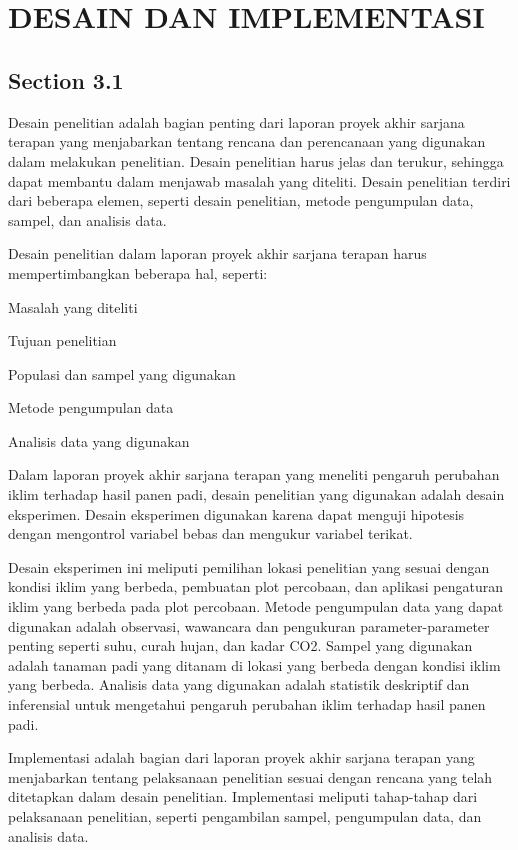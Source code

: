 \chapter[DESAIN DAN IMPLEMENTASI]{\\ DESAIN DAN IMPLEMENTASI}

\section{Section 3.1}
Desain penelitian adalah bagian penting dari laporan proyek akhir sarjana terapan yang menjabarkan tentang rencana dan perencanaan yang digunakan dalam melakukan penelitian. Desain penelitian harus jelas dan terukur, sehingga dapat membantu dalam menjawab masalah yang diteliti. Desain penelitian terdiri dari beberapa elemen, seperti desain penelitian, metode pengumpulan data, sampel, dan analisis data.

Desain penelitian dalam laporan proyek akhir sarjana terapan harus mempertimbangkan beberapa hal, seperti:
\begin{packed_item}
    \item Masalah yang diteliti
    \item Tujuan penelitian
    \item Populasi dan sampel yang digunakan
    \item Metode pengumpulan data
    \item Analisis data yang digunakan
\end{packed_item}

Dalam laporan proyek akhir sarjana terapan yang meneliti pengaruh perubahan iklim terhadap hasil panen padi, desain penelitian yang digunakan adalah desain eksperimen. Desain eksperimen digunakan karena dapat menguji hipotesis dengan mengontrol variabel bebas dan mengukur variabel terikat.

Desain eksperimen ini meliputi pemilihan lokasi penelitian yang sesuai dengan kondisi iklim yang berbeda, pembuatan plot percobaan, dan aplikasi pengaturan iklim yang berbeda pada plot percobaan. Metode pengumpulan data yang dapat digunakan adalah observasi, wawancara dan pengukuran parameter-parameter penting seperti suhu, curah hujan, dan kadar CO2. Sampel yang digunakan adalah tanaman padi yang ditanam di lokasi yang berbeda dengan kondisi iklim yang berbeda. Analisis data yang digunakan adalah statistik deskriptif dan inferensial untuk mengetahui pengaruh perubahan iklim terhadap hasil panen padi.

Implementasi adalah bagian dari laporan proyek akhir sarjana terapan yang menjabarkan tentang pelaksanaan penelitian sesuai dengan rencana yang telah ditetapkan dalam desain penelitian. Implementasi meliputi tahap-tahap dari pelaksanaan penelitian, seperti pengambilan sampel, pengumpulan data, dan analisis data.

